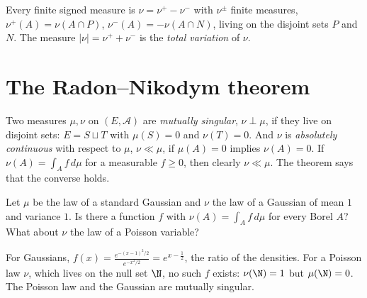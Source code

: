 \begin{corollary}\label{cor:jordan}
Every finite signed measure is $\nu=\nu^+-\nu^-$ with $\nu^\pm$ finite measures, $\nu^+(A)=\nu(A\cap P)$, $\nu^-(A)=-\nu(A\cap N)$, living on the disjoint sets $P$ and $N$. The measure
$|\nu|=\nu^++\nu^-$ is the \emph{total variation} of $\nu$.
\end{corollary}

\section{The Radon--Nikodym theorem}

Two measures $\mu,\nu$ on $(E,\mathcal A)$ are \emph{mutually singular}, $\nu\perp\mu$, if they live on disjoint sets: $E=S\sqcup T$ with $\mu(S)=0$ and $\nu(T)=0$. And $\nu$ is \emph{absolutely continuous} with respect to
$\mu$, $\nu\ll\mu$, if $\mu(A)=0$ implies $\nu(A)=0$. If $\nu(A)=\int_Af\,d\mu$ for a measurable $f\ge0$, then clearly $\nu\ll\mu$. The theorem says that the converse holds.

\begin{think}
Let $\mu$ be the law of a standard Gaussian and $\nu$ the law of a Gaussian of mean $1$ and variance $1$. Is there a function $f$ with $\nu(A)=\int_Af\,d\mu$ for every Borel $A$? What about $\nu$ the law
of a Poisson variable?
\end{think}

For Gaussians, $f(x)=\frac{e^{-(x-1)^2/2}}{e^{-x^2/2}}=e^{x-\frac12}$, the ratio of the densities. For a Poisson law $\nu$, which lives on the null set $\N$, no such $f$ exists: $\nu(\N)=1$ but $\mu(\N)=0$. The
Poisson law and the Gaussian are mutually singular.

